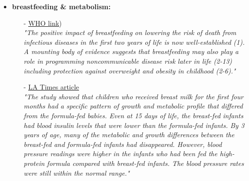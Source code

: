 \documentclass[11pt, a4paper]{article} %
\begin{document}
\begin{itemize}
\item \textbf{breastfeeding \& metabolism:}

\begin{itemize}
\item[-]\href{http://www.who.int/elena/titles/bbc/breastfeeding_childhood_obesity/en/}{WHO link})\\ 
\textit{"The positive impact of breastfeeding on lowering the risk of death from infectious diseases in the first two years of life is now well-established (1). A mounting body of evidence suggests that breastfeeding may also play a role in programming noncommunicable disease risk later in life (2-13) including protection against overweight and obesity in childhood (2-6)."}

\item[-]\href{http://articles.latimes.com/2011/may/02/news/la-heb-infant-feeding-20110502}{LA Times article}\\
\textit{"The study showed that children who received breast milk for the first four months had a specific pattern of growth and metabolic profile that differed from the formula-fed babies. Even at 15 days of life, the breast-fed infants had blood insulin levels that were lower than the formula-fed infants.\newline
By 3 years of age, many of the metabolic and growth differences between the breast-fed and formula-fed infants had disappeared. However, blood pressure readings were higher in the infants who had been fed the high-protein formula compared with breast-fed infants. The blood pressure rates were still within the normal range."}
\end{itemize}
\end{itemize}
\end{document}

